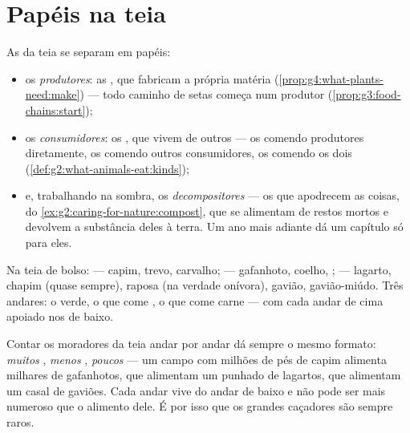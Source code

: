 \section{Papéis na teia}

\begin{definition}\label{def:g5:food-webs:roles}
As  da teia se separam em papéis:
\begin{itemize}
  \item os \emph{produtores}: as , que
        fabricam a própria matéria
        (\cref{prop:g4:what-plants-need:make}) --- todo caminho de
        setas começa num produtor
        (\cref{prop:g3:food-chains:start});
  \item os \emph{consumidores}: os , que
        vivem de outros --- os  comendo produtores
        diretamente, os  comendo outros consumidores, os
         comendo os dois (\cref{def:g2:what-animals-eat:kinds});
  \item e, trabalhando na sombra, os
        \emph{decompositores} --- os que
        apodrecem as coisas, do \cref{ex:g2:caring-for-nature:compost},
        que se alimentam de restos mortos e devolvem a substância
        deles à terra. Um ano mais adiante dá um capítulo só para
        eles.
\end{itemize}
\end{definition}

\begin{example}\label{ex:g5:food-webs:sorting}
Na teia de bolso:  --- capim, trevo, carvalho;
  --- gafanhoto, coelho, ; 
 --- lagarto, chapim (quase sempre), raposa (na verdade
onívora), gavião, gavião-miúdo. Três andares: o verde, o que come
, o que come carne --- com cada andar de cima apoiado nos de
baixo.
\end{example}

\begin{proposition}\label{prop:g5:food-webs:pyramid}
Contar os moradores da teia andar por andar dá sempre o mesmo
formato: \emph{muitos} , \emph{menos} ,
\emph{poucos}  --- um campo com milhões de pés de capim
alimenta milhares de gafanhotos, que alimentam um punhado de
lagartos, que alimentam um casal de gaviões. Cada andar vive do
andar de baixo e não pode ser mais numeroso que o alimento dele. É
por isso que os grandes caçadores são sempre raros.
\end{proposition}
\admitted

